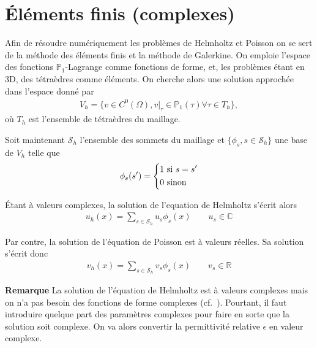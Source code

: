\section{Éléments finis (complexes)}

Afin de résoudre numériquement les problèmes de Helmholtz et Poisson
on se sert de la méthode des éléments finis et la méthode de Galerkine.
On emploie l'espace des fonctions $\mathbb{P}_1$-Lagrange comme
fonctions de forme, et, les problèmes étant en 3D, des tétraèdres comme
éléments. On cherche alors une solution approchée dans l'espace donné
par
\begin{align}
    V_h = \{v \in C^0(\Omega), v|_\tau \in \mathbb{P}_1(\tau)
            \forall \tau \in T_h \},
\end{align}
%
où $T_h$ est l'ensemble de tétraèdres du maillage.

Soit maintenant $\mathcal{S}_h$ l'ensemble des sommets du maillage et
$\{\phi_s, s \in \mathcal{S}_h\}$ une base de $V_h$ telle que
\[\phi_s(s') =
    \begin{dcases}
        1 \text{ si } s = s' \\
        0 \text{ sinon}
    \end{dcases}
\]

Étant à valeurs complexes, la solution de l'equation de Helmholtz s'écrit
alors
\begin{align}
    u_h(x) = \sum_{s \in \mathcal{S}_h} u_s \phi_s(x) \qquad u_s \in \mathbb{C}
\end{align}

Par contre, la solution de l'équation de Poisson est à valeurs réelles.
Sa solution s'écrit donc
\begin{align}
    v_h(x) = \sum_{s \in \mathcal{S}_h} v_s \phi_s(x) \qquad v_s \in \mathbb{R}
\end{align}

\textbf{Remarque} \quad La solution de l'équation de Helmholtz est à valeurs
complexes mais on n'a pas besoin des fonctions de forme complexes
(cf.~\cite{hecht_elements_finis}). Pourtant, il faut introduire quelque part
des paramètres complexes pour faire en sorte que la solution soit complexe.
On va alors convertir la permittivité relative $\epsilon$ en valeur complexe.
